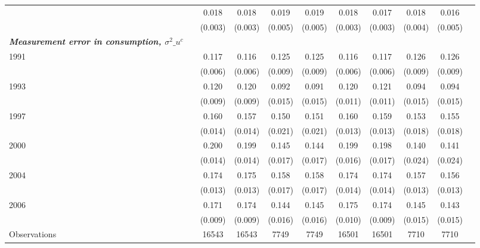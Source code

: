 \begin{tabular}{l*{10}{c}}
\hspace{.3cm}       &            &       0.018&       0.018&       0.019&       0.019&       0.018&       0.017&       0.018&       0.016\\
                    &            &     (0.003)&     (0.003)&     (0.005)&     (0.005)&     (0.003)&     (0.003)&     (0.004)&     (0.005)\\
\textbf{\emph{Measurement error in consumption, $\sigma^2\_{u^c}$}}&            &            &            &            &            &            &            &            &            \\
\hspace{.3cm} 1991  &            &       0.117&       0.116&       0.125&       0.125&       0.116&       0.117&       0.126&       0.126\\
                    &            &     (0.006)&     (0.006)&     (0.009)&     (0.009)&     (0.006)&     (0.006)&     (0.009)&     (0.009)\\
\hspace{.3cm} 1993  &            &       0.120&       0.120&       0.092&       0.091&       0.120&       0.121&       0.094&       0.094\\
                    &            &     (0.009)&     (0.009)&     (0.015)&     (0.015)&     (0.011)&     (0.011)&     (0.015)&     (0.015)\\
\hspace{.3cm} 1997  &            &       0.160&       0.157&       0.150&       0.151&       0.160&       0.159&       0.153&       0.155\\
                    &            &     (0.014)&     (0.014)&     (0.021)&     (0.021)&     (0.013)&     (0.013)&     (0.018)&     (0.018)\\
\hspace{.3cm} 2000  &            &       0.200&       0.199&       0.145&       0.144&       0.199&       0.198&       0.140&       0.141\\
                    &            &     (0.014)&     (0.014)&     (0.017)&     (0.017)&     (0.016)&     (0.017)&     (0.024)&     (0.024)\\
\hspace{.3cm} 2004  &            &       0.174&       0.175&       0.158&       0.158&       0.174&       0.174&       0.157&       0.156\\
                    &            &     (0.013)&     (0.013)&     (0.017)&     (0.017)&     (0.014)&     (0.014)&     (0.013)&     (0.013)\\
\hspace{.3cm} 2006  &            &       0.171&       0.174&       0.144&       0.145&       0.175&       0.174&       0.145&       0.143\\
                    &            &     (0.009)&     (0.009)&     (0.016)&     (0.016)&     (0.010)&     (0.009)&     (0.015)&     (0.015)\\
\midrule
Observations        &            &       16543&       16543&        7749&        7749&       16501&       16501&        7710&        7710\\
\bottomrule
\end{tabular}
